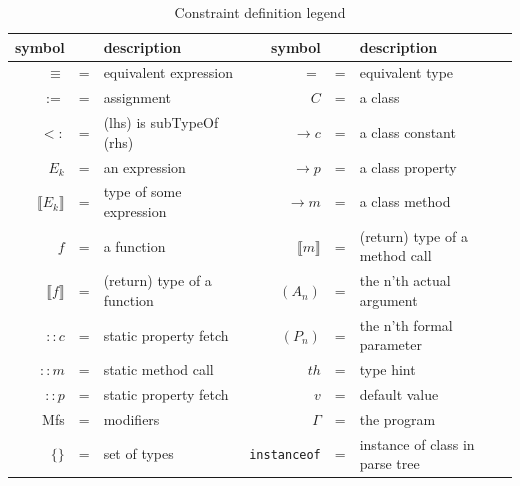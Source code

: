 \documentclass[../main.tex]{subfiles}
\begin{document}
    \begin{table}[H]
    	\center
        \begin{tabular}{ r c l | r c l } 
        	\toprule
        	symbol & & description & 
        	symbol & & description \\ 
        	\midrule
 
            $\equiv$ & = & equivalent expression &
            $=$     & = & equivalent type \\
            
            $:=$    & = & assignment &
            $C$     & = & a class \\
            
            $<:$    & = & (lhs) is subTypeOf (rhs) &
            $\rightarrow c$     & = & a class constant \\
            
            $E_k$   & = & an expression &
            $\rightarrow p$     & = & a class property \\
            
            $\llbracket{}E_k\rrbracket{}$ & = & type of some expression &
            $\rightarrow m$     & = & a class method \\
            
            $f$     & = & a function &
            $\llbracket{}m\rrbracket{}$   & = & (return) type of a method call \\
            
            $\llbracket{}f\rrbracket{}$   & = & (return) type of a function &
            $(A_n)$ & = & the n'th actual argument \\
            
            $::c$   & = & static property fetch &
            $(P_n)$ & = & the n'th formal parameter \\
            
            $::m$   & = & static method call &
            $th$    & = & type hint \\
            
            $::p$   & = & static property fetch &
            $v$     & = & default value \\
            
            Mfs     & = & modifiers &
            $\Gamma$ & = & the program \\
                        
            $\{ \}$     & = & set of types &
            \texttt{instanceof} & = & instance of class in parse tree	
            
        \end{tabular}
        \caption{Constraint definition legend}
        \label{table:constraintLegend}
   \end{table}
   
\end{document}
